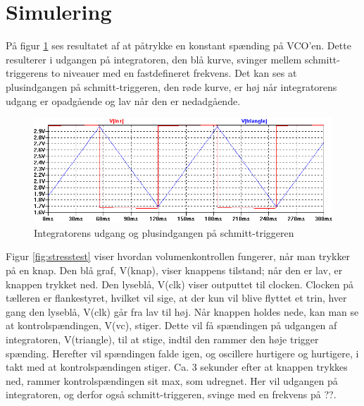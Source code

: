 \section{Simulering}
\label{volumenkontrol-simulering}
På figur \ref{fig:vco-signal} ses resultatet af at påtrykke en konstant spænding på VCO'en. Dette resulterer i udgangen på integratoren, den blå kurve, svinger mellem schmitt-triggerens to niveauer med en fastdefineret frekvens. Det kan ses at plusindgangen på schmitt-triggeren, den røde kurve, er høj når integratorens udgang er opadgående og lav når den er nedadgående. 

\begin{figure}[h]
\centering
\includegraphics[width=\textwidth]{teknisk/volumenkontrol/vco-signal.png}
\caption{Integratorens udgang og plusindgangen på schmitt-triggeren}
\label{fig:vco-signal}
\end{figure}

Figur \ref{fig:stresstest} viser hvordan volumenkontrollen fungerer, når man trykker på en knap. Den blå graf, V(knap), viser knappens tilstand; når den er lav, er knappen trykket ned. Den lyseblå, V(clk) viser outputtet til clocken. Clocken på tælleren er flankestyret, hvilket vil sige, at der kun vil blive flyttet et trin, hver gang den lyseblå, V(clk) går fra lav til høj. Når knappen holdes nede, kan man se at kontrolspændingen, V(vc), stiger. Dette vil få spændingen på udgangen af integratoren, V(triangle), til at stige, indtil den rammer den høje trigger spænding. Herefter vil spændingen falde igen, og oscillere hurtigere og hurtigere, i takt med at kontrolspændingen stiger. Ca. 3 sekunder efter at knappen trykkes ned, rammer kontrolspændingen sit max, som udregnet. Her vil udgangen på integratoren, og derfor også schmitt-triggeren, svinge med en frekvens på ??.

